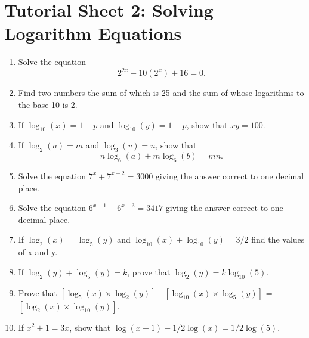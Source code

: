 \documentclass[a4paper,12pt]{article}
\begin{document}
\section*{Tutorial Sheet 2: Solving Logarithm Equations}

\begin{enumerate}

\item Solve the equation \[2^{2x} - 10(2^x) + 16 = 0. \]

   \item Find two numbers the sum of which is 25 and the sum of whose logarithms to the base 10 is 2.

   \item If $\log_{10}(x) = 1 + p$ and $\log_{10}(y) = 1 - p$, show that $xy=100$.

   \item If $\log_{2}(a) = m$ and $\log_{3}(v) = n$, show that \[n \log_{6}(a) + m \log_{6}(b) = mn.\] 

      \item Solve the equation $7^{x} + 7^{x+2} = 3000$ giving the answer correct to one decimal place. 

    \item Solve the equation $6^{x-1} + 6^{x-3} = 3417$ giving the answer correct to one decimal place. 




    \item If $\log_2(x)$  = $\log_5(y)$  and $\log_{10}(x)  + \log_{10}(y)  = 3/2$ find the values of x and y. 

    \item If $\log_2(y) + \log_5(y) = k$, prove that $\log_{2}(y) = k \log_{10}(5)$.     


\item Prove that $\left[ \log_5(x) \times \log_2(y) \right]$  - $\left[ \log_{10}(x) \times \log_5(y) \right]$ = $\left[ \log_2(x) \times \log_{10}(y) \right]$. 



\item If $x^2 + 1 = 3x$, show that $\log (x + 1) - 1/2 \log(x) = 1/2\log(5)$.   




\end{enumerate}
\end{document}
